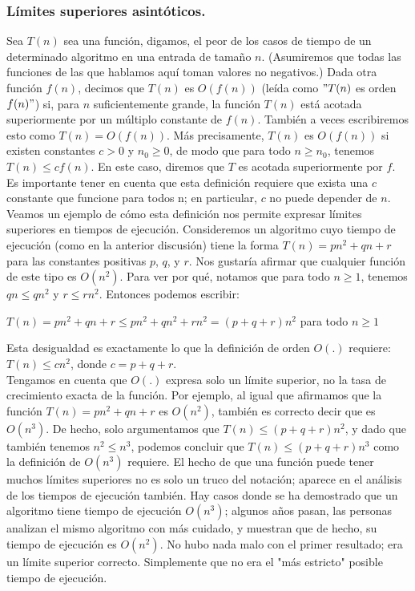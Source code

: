 \documentclass[a4paper]{article}
\begin{document}
\subsubsection*{Límites superiores asintóticos.}

Sea $T(n)$ sea una función, digamos, el peor de los casos de tiempo de un determinado algoritmo en una entrada de tamaño $n$. (Asumiremos que todas las funciones de las que hablamos aquí toman valores no negativos.) Dada otra función $f(n)$, decimos que $T(n)$ es $O(f(n))$ (leída como $"T (n)$ es orden $f(n)"$) si, para $n$ suficientemente grande, la función $T(n)$ está acotada superiormente por un múltiplo constante de $f(n)$. También a veces escribiremos esto como $T (n) = O(f(n))$. Más precisamente, $T(n)$ es $O(f(n))$ si existen constantes $c > 0$ y $n_0 ≥ 0$, de modo que para todo $n ≥ n_0$, tenemos $T(n) ≤ c f (n)$. En este caso, diremos que $T$ es  acotada superiormente por $f$. Es importante tener en cuenta que esta definición requiere que exista una $c$ constante que funcione para todos n; en particular, $c$ no puede depender de $n$. \\

Veamos un ejemplo de cómo esta definición nos permite expresar límites superiores en tiempos de ejecución. Consideremos un algoritmo cuyo tiempo de ejecución (como en la anterior discusión) tiene la forma $T (n) = pn^2 + qn + r$ para las constantes positivas $p$, $q$, y $r$. Nos gustaría afirmar que cualquier función de este tipo es $O(n^2)$. Para ver por qué, notamos que para todo $n ≥ 1$, tenemos $qn ≤ qn^2$ y $r ≤ rn^2$. Entonces podemos escribir: 

\begin{center}$T (n) = pn^2 + qn + r  ≤ pn^2+ qn^2 + rn^2 = (p + q + r)n^2$ para todo $n ≥ 1$\end{center}

Esta desigualdad es exactamente lo que la definición de orden $O(.)$ requiere: $T(n) ≤ cn^2$, donde $c = p + q + r$. \\

Tengamos en cuenta que $O(.)$ expresa solo un límite superior, no la tasa de crecimiento exacta de la función. Por ejemplo, al igual que afirmamos que la función $T (n) = pn^2 + qn + r$ es $O(n^2)$, también es correcto decir que es $O(n^3)$. De hecho, solo argumentamos que $T (n) ≤ (p + q + r) n^2$, y dado que también tenemos $n^2 ≤ n^3$, podemos concluir que $T (n) ≤ (p + q + r) n^3$ como la definición de $O(n^3)$ requiere. El hecho de que una función puede tener muchos límites superiores no es solo un truco del notación; aparece en el análisis de los tiempos de ejecución también. Hay casos donde se ha demostrado que un algoritmo tiene tiempo de ejecución $O(n^3)$; algunos años pasan, las personas analizan el mismo algoritmo con más cuidado, y muestran que de hecho, su tiempo de ejecución es $O (n^2)$. No hubo nada malo con el primer resultado; era un límite superior correcto. Simplemente que no era el "más estricto" posible tiempo de ejecución. \\
\end{document}
